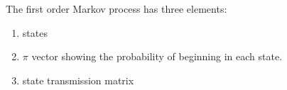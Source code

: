 \documentclass[12pt, a4paper, oneside]{article} %
\begin{document}







The first order Markov process has three elements: 
\begin{enumerate}
\item states
\item $\pi$ vector showing the probability of beginning in each state. 
\item state transmission matrix
\end{enumerate}
\end{document}
